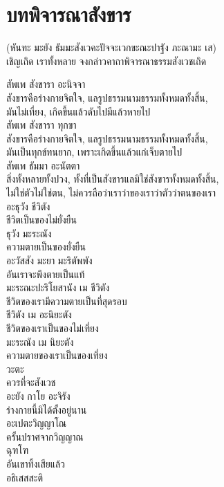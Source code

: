 \documentclass{article}
\begin{document}
\section{บทพิจารณาสังขาร }
\begin{center}
 (หันทะ มะยัง ธัมมะสังเวคะปัจจะเวกขะณะปาฐัง ภะณามะ เส)\\
เชิญเถิด เราทั้งหลาย จงกล่าวคาถาพิจารณาธรรมสังเวชเถิด
\end{center}
สัพเพ สังขารา อะนิจจา\\
\indent สังขารคือร่างกายจิตใจ, แลรูปธรรมนามธรรมทั้งหมดทั้งสิ้น,\\
มันไม่เที่ยง, เกิดขึ้นแล้วดับไปมีแล้วหายไป\\
สัพเพ สังขารา ทุกขา\\
\indent สังขารคือร่างกายจิตใจ, แลรูปธรรมนามธรรมทั้งหมดทั้งสิ้น,\\
มันเป็นทุกข์ทนยาก, เพราะเกิดขึ้นแล้วแก่เจ็บตายไป\\
สัพเพ ธัมมา อะนัตตา\\
\indent สิ่งทั้งหลายทั้งปวง, ทั้งที่เป็นสังขารแลมิใช่สังขารทั้งหมดทั้งสิ้น,\\
ไม่ใช่ตัวไม่ใช่ตน, ไม่ควรถือว่าเราว่าของเราว่าตัวว่าตนของเรา\\
อะธุวัง ชีวิตัง\\
\indent ชีวิตเป็นของไม่ยั่งยืน\\
ธุวัง มะระณัง\\
\indent ความตายเป็นของยั่งยืน\\
อะวัสสัง มะยา มะริตัพพัง\\
\indent อันเราจะพึงตายเป็นแท้\\
มะระณะปะริโยสานัง เม ชีวิตัง\\
\indent ชีวิตของเรามีความตายเป็นที่สุดรอบ\\
ชีวิตัง เม อะนิยะตัง\\
\indent ชีวิตของเราเป็นของไม่เที่ยง\\
มะระณัง เม นิยะตัง\\
\indent ความตายของเราเป็นของเที่ยง\\
วะตะ\\
\indent ควรที่จะสังเวช\\
อะยัง กาโย อะจิรัง\\
\indent ร่างกายนี้มิได้ตั้งอยู่นาน\\
อะเปตะวิญญาโณ\\
\indent ครั้นปราศจากวิญญาณ\\
ฉุฑโฑ\\
\indent อันเขาทิ้งเสียแล้ว\\
อธิเสสสะติ\\
\end{document}
